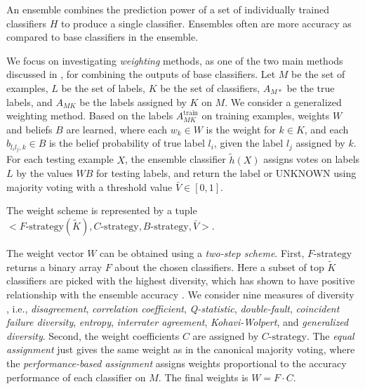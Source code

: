 An ensemble combines the prediction power of a set of individually trained classifiers $H$ to produce a single classifier. Ensembles often are more accuracy as compared to base classifiers in the ensemble. %

We focus on investigating \emph{weighting} methods, as one of the two main methods discussed in \cite{rokach2010ensemble}, for combining the outputs of base classifiers. Let $M$ be the set of examples, $L$ be the set of labels, $K$ be the set of classifiers, $A_{M*}$ be the true labels, and $A_{MK}$ be the labels assigned by $K$ on $M$. We consider a generalized weighting method. Based on the labels $A_{MK}^\text{train}$ on training examples, weights $W$ and beliefs $B$ are learned, where each $w_k \in W$ is the weight for $k\in K$, and each $b_{l_il_j,k} \in B$ is the belief probability of true label $l_i$, given the label $l_j$ assigned by $k$. For each testing example $X$, the ensemble classifier $\tilde{h}(X)$ assigns votes on labels $L$ by the values $WB$ for testing labels, and return the label or UNKNOWN using majority voting with a threshold value $\bar{V} \in [0, 1]$.

The weight scheme is represented by a tuple $<F\text{-strategy}(\tilde{K}), C\text{-strategy}, B\text{-strategy}, \bar{V}>$.

The weight vector $W$ can be obtained using a \emph{two-step scheme}. First, $F\text{-strategy}$ returns a binary array $F$ about the chosen classifiers. Here a subset of top $\tilde{K}$ classifiers are picked with the highest diversity, which has shown to have positive relationship with the ensemble accuracy \cite{kuncheva2003measures}. We consider nine measures of diversity \cite{kuncheva2003measures}, i.e., \emph{disagreement}, \emph{correlation coefficient}, \emph{Q-statistic}, \emph{double-fault}, \emph{coincident failure diversity}, \emph{entropy}, \emph{interrater agreement}, \emph{Kohavi-Wolpert}, and \emph{generalized diversity}. Second, the weight coefficients $C$ are assigned by $C\text{-strategy}$. The \emph{equal assignment} just gives the same weight as in the canonical majority voting, where the \emph{performance-based assignment} \cite{opitz1996generating} assigns weights proportional to the accuracy performance of each classifier on $M$. The final weights is $W=F\cdot C$.

